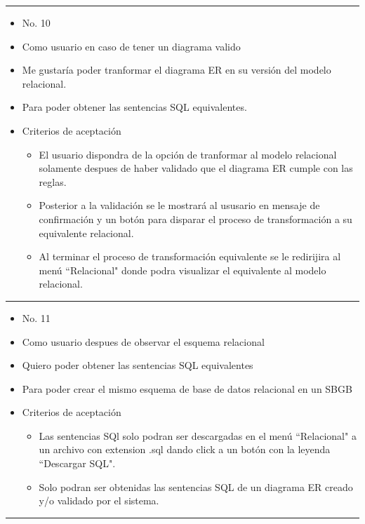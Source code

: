 \noindent\rule{\textwidth}{1pt}
\begin{itemize}
	\item No. 10
	\item Como usuario en caso de tener un diagrama valido
	\item Me gustaría poder tranformar el diagrama ER en su versión del modelo relacional.
	\item Para poder obtener las sentencias SQL equivalentes.
	\item Criterios de aceptación
	\begin{itemize}
		\item El usuario dispondra de la opción de tranformar al modelo relacional solamente despues de haber validado que el diagrama ER cumple con las reglas.
		\item Posterior a la validación se le mostrará al ususario en mensaje de confirmación y un botón para disparar el proceso de transformación a su equivalente relacional.
		\item Al terminar el proceso de transformación equivalente se le redirijira al menú ``Relacional" donde podra visualizar el equivalente al modelo relacional.
	\end{itemize}
\end{itemize}
\noindent\rule{\textwidth}{1pt}
\begin{itemize}
	\item No. 11
	\item Como usuario despues de observar el esquema relacional
	\item Quiero poder obtener las sentencias SQL equivalentes
	\item Para poder crear el mismo esquema de base de datos relacional en un SBGB
	\item Criterios de aceptación
	\begin{itemize}
		\item Las sentencias SQl solo podran ser descargadas en el menú ``Relacional" a un archivo con extension .sql dando click a un botón con la leyenda ``Descargar SQL".
		\item Solo podran ser obtenidas las sentencias SQL de un diagrama ER creado y/o validado por el sistema.
	\end{itemize}
\end{itemize}
\noindent\rule{\textwidth}{1pt}
